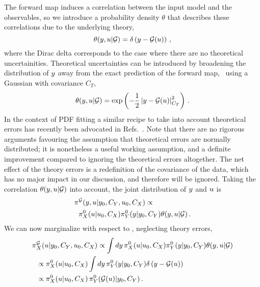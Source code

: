 The forward map induces a correlation between the input model and the
observables, so we introduce a probability density $\theta$ that describes these
correlations due to the underlying theory,  
\begin{equation}
  \label{eq:ThetaCorr}
  \theta(y,u|\mathcal{G}) = \delta\left(y - \mathcal{G}(u)\right)\, ,
\end{equation}
where the Dirac delta corresponds to the case where there are no theoretical
uncertainities. Theoretical uncertainties can be introduced by broadening the
distribution of $y$ away from the exact prediction of the forward map, \eg\
using a Gaussian with covariance $C_T$,
\begin{equation}
  \label{eq:TheoryErrors}
  \theta(y,u|\mathcal{G}) = \exp\left(
    -\frac12 
    \left| y - \mathcal{G}(u)
    \right|_{C_T}^2\right)\, .
\end{equation}
In the context of PDF fitting a similar recipe to take into account theoretical
errors has recently been advocated in
Refs.~\cite{NNPDF:2019vjt,AbdulKhalek:2019ihb}. Note that there are no rigorous
arguments favouring the assumption that theoretical errors are normally
distributed; it is nonetheless a useful working assumption, and a definite
improvement compared to ignoring the theoretical errors altogether. The net
effect of the theory errors is a redefinition of the covariance of the data,
which has no major impact in our discussion, and therefore will be ignored.
Taking the correlation $\theta(y,u|\mathcal{G})$ into account, the
joint distribution of $y$ and $u$ is
\begin{align}
  \label{eq:JointYAndU}
  \pi&^{\mathcal{G}}(y,u|y_0,C_{Y},u_0,C_X)
  \propto \nonumber \\ 
  &\pi_{X}^0(u|u_0, C_X) 
  \pi_{Y}^0(y|y_0,C_{Y}) 
  \theta(y,u|\mathcal{G})\, .
\end{align}
We can now marginalize with respect to \obs, neglecting theory errors, 
\begin{align}
  \label{eq:MarginOne}
  \pi&^{\mathcal{G}}_{X}(u|y_0,C_{Y},u_0,C_X) 
  \propto \int dy\, 
    \pi_{X}^0(u|u_0,C_X) 
    \pi_{Y}^0(y|y_0,C_{Y}) 
    \theta(y,u|\mathcal{G}) \nonumber \\ 
  & \propto \pi_{X}^0(u|u_0,C_X)  
    \int dy\, 
    \pi_{Y}^0(y|y_0,C_{Y}) 
    \delta\left(y-\mathcal{G}(u)\right) \nonumber \\
  & \propto 
    \pi_{X}^0(u|u_0,C_X) \,
    \pi_{Y}^0(\mathcal{G}(u)|y_0,C_{Y})\, .
\end{align}
